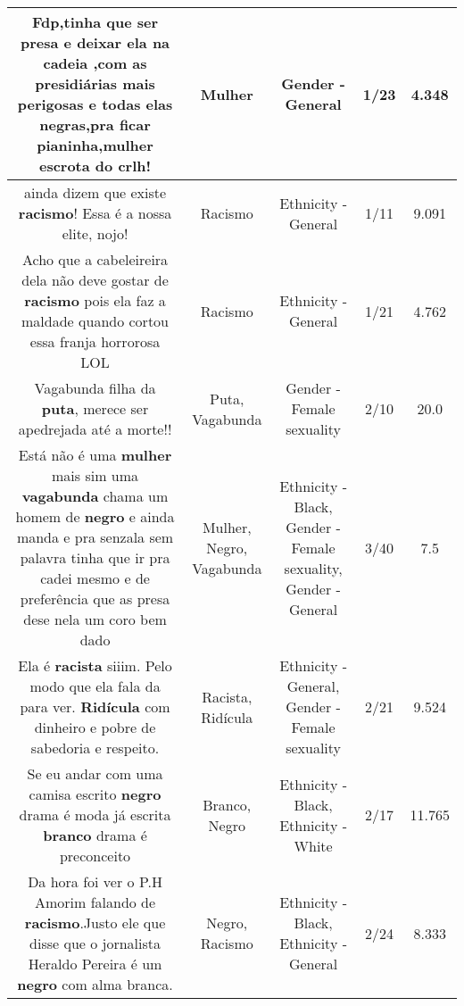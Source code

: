 \documentclass[11pt]{article}
\newlength\mylength
\begin{document}
\begin{center}
\begin{longtable}{|C{.65\mylength}|C{.30\mylength}|C{.12\mylength}|C{.12\mylength}|C{.12\mylength}|}
  \small Fdp,tinha que ser presa e deixar ela na cadeia ,com as presidiárias mais perigosas e todas elas negras,pra ficar pianinha,\textbf{mulher} escrota do crlh!\normalsize   & Mulher & Gender - General & 1/23 & 4.348 \\  \hline
  \small ainda dizem que existe \textbf{racismo}! Essa é a nossa elite, nojo!\normalsize   & Racismo & Ethnicity - General & 1/11 & 9.091 \\  \hline
  \small Acho que a cabeleireira dela não deve gostar de \textbf{racismo} pois ela faz a maldade quando cortou essa franja horrorosa  LOL\normalsize   & Racismo & Ethnicity - General & 1/21 & 4.762 \\  \hline
  \small Vagabunda filha da \textbf{puta}, merece ser apedrejada até a morte!!\normalsize   & Puta, Vagabunda & Gender - Female sexuality & 2/10 & 20.0 \\  \hline
  \small Está não é uma \textbf{mulher} mais sim uma \textbf{vagabunda} chama um homem de \textbf{negro} e ainda manda e pra senzala sem palavra tinha que ir pra cadei mesmo e de preferência que as presa dese nela um coro bem dado\normalsize   & Mulher, Negro, Vagabunda & Ethnicity - Black, Gender - Female sexuality, Gender - General & 3/40 & 7.5 \\  \hline
  \small Ela é \textbf{racista} siiim. Pelo modo que ela fala da para ver. \textbf{Ridícula} com dinheiro e pobre de sabedoria e respeito.\normalsize   & Racista, Ridícula & Ethnicity - General, Gender - Female sexuality & 2/21 & 9.524 \\  \hline
  \small Se eu andar com uma camisa escrito \textbf{negro} drama é  moda já escrita \textbf{branco} drama é preconceito\normalsize   & Branco, Negro & Ethnicity - Black, Ethnicity - White & 2/17 & 11.765 \\  \hline
  \small Da hora foi ver o P.H Amorim falando de \textbf{racismo}.Justo ele que disse que o jornalista Heraldo Pereira é um \textbf{negro} com alma branca.\normalsize   & Negro, Racismo & Ethnicity - Black, Ethnicity - General & 2/24 & 8.333 \\  \hline

\end{longtable}
\end{center}
\end{document}
